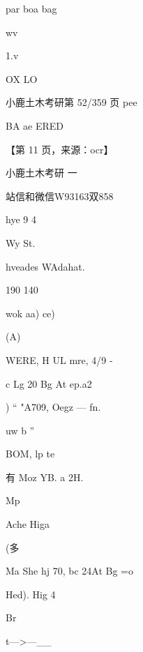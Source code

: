 \documentclass[UTF8,12pt,a4paper,openany]{ctexbook}
\begin{document}
\begin{enumerate}[label=\textbf{\arabic*.},leftmargin=2em]
par boa      bag\par wv\par 1.v\par OX LO\par 小鹿土木考研第 52/359 页                            pee\par BA ae ERED\par \par 【第 11 页，来源：ocr】\par 小鹿土木考研                 一\par 站信和微信W93163双858\par hye 9 4\par Wy St.\par hveades WAdahat.\par 190       140\par wok   aa) ce)\par (A)\par WERE, H UL mre, 4/9 -\par c Lg 20 Bg At ep.a2\par )                   “          "A709, Oegz — fn.\par uw b ”\par BOM, lp te\par 有    Moz YB. a 2H.\par Mp\par Ache Higa\par (多\par Ma She            hj 70,   bc 24At Bg =o\par Hed). Hig 4\par Br\par t—>—\_\_                
\end{enumerate}
\end{document}
